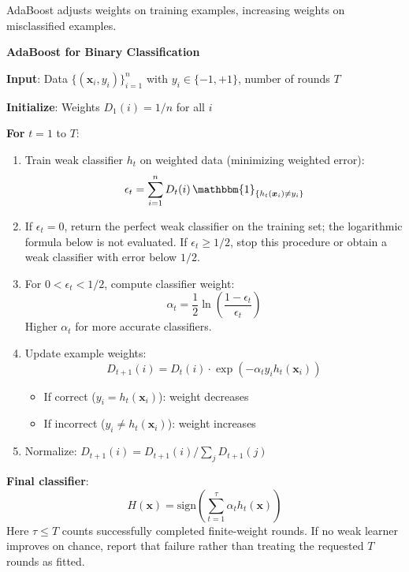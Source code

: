 \documentclass[11pt,twoside]{article}
\numberwithin{equation}{section}
\newcommand{\vect}[1]{\bm{#1}}
\newcommand{\indicator}[1]{\mathbbm{1}_{\{#1\}}}
\theoremstyle{plain}
\theoremstyle{definition}
\theoremstyle{remark}
\begin{document}
AdaBoost adjusts weights on training examples, increasing weights on misclassified examples.

\begin{algorithmbox}
\textbf{AdaBoost for Binary Classification}

\textbf{Input}: Data $\{(\vect{x}_i, y_i)\}_{i=1}^n$ with $y_i \in \{-1, +1\}$, number of rounds $T$

\textbf{Initialize}: Weights $D_1(i) = 1/n$ for all $i$

\textbf{For} $t = 1$ to $T$:
\begin{enumerate}
\item Train weak classifier $h_t$ on weighted data (minimizing weighted error):
\[
\epsilon_t = \sum_{i=1}^n D_t(i) \,\indicator{h_t(\vect x_i)\neq y_i}
\]
\item If $\epsilon_t=0$, return the perfect weak classifier on the training set; the logarithmic formula below is not evaluated. If $\epsilon_t\geq1/2$, stop this procedure or obtain a weak classifier with error below $1/2$.
\item For $0<\epsilon_t<1/2$, compute classifier weight:
\[
\alpha_t = \frac{1}{2}\ln\left(\frac{1-\epsilon_t}{\epsilon_t}\right)
\]
Higher $\alpha_t$ for more accurate classifiers.

\item Update example weights:
\[
D_{t+1}(i) = D_t(i) \cdot \exp(-\alpha_t y_i h_t(\vect{x}_i))
\]
\begin{itemize}
\item If correct ($y_i = h_t(\vect{x}_i)$): weight decreases
\item If incorrect ($y_i \neq h_t(\vect{x}_i)$): weight increases
\end{itemize}

\item Normalize: $D_{t+1}(i) = D_{t+1}(i) / \sum_j D_{t+1}(j)$
\end{enumerate}

\textbf{Final classifier}:
\[
H(\vect{x}) = \text{sign}\left(\sum_{t=1}^{\tau} \alpha_t h_t(\vect{x})\right)
\]
Here $\tau\le T$ counts successfully completed finite-weight rounds. If no weak learner improves on chance, report that failure rather than treating the requested $T$ rounds as fitted.
\end{algorithmbox}
\end{document}
